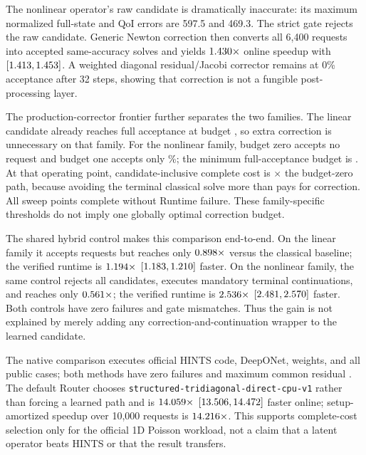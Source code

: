 The nonlinear operator's raw candidate is dramatically inaccurate: its maximum
normalized full-state and QoI errors are 597.5 and 469.3. The strict gate rejects
the raw candidate. Generic Newton correction then converts all 6,400 requests into
accepted same-accuracy solves and yields $1.430\times$ online
speedup with $[1.413,1.453]$. A weighted
diagonal residual/Jacobi corrector remains at 0\% acceptance after 32 steps, showing
that correction is not a fungible post-processing layer.

The production-corrector frontier further separates the two families. The linear
candidate already reaches full acceptance at budget
\LinearMinimumCorrectionBudget{}, so extra correction is unnecessary on that family.
For the nonlinear family, budget zero accepts no request and budget one accepts only
\NonlinearBudgetOneAcceptancePercent\%; the minimum full-acceptance budget is
\NonlinearMinimumCorrectionBudget{}. At that operating point, candidate-inclusive
complete cost is \NonlinearBudgetTwoVsZeroCostRatio{}$\times$ the budget-zero path,
because avoiding the terminal classical solve more than pays for correction. All
sweep points complete without Runtime failure. These family-specific thresholds do
not imply one globally optimal correction budget.

The shared hybrid control makes this comparison end-to-end. On the linear family it
accepts \LinearSharedAccepted{} requests but reaches only
$0.898\times$ versus the classical baseline; the verified
runtime is $1.194\times$
$[1.183,1.210]$ faster.
On the nonlinear family, the same control rejects all candidates, executes
\NonlinearSharedFallbacks{} mandatory terminal continuations, and reaches only
$0.561\times$; the verified runtime is
$2.536\times$
$[2.481,2.570]$
faster. Both controls have zero failures and gate mismatches. Thus the gain is not
explained by merely adding any correction-and-continuation wrapper to the learned
candidate.

The native comparison executes official HINTS code, DeepONet, weights, and all
\HintsNativeCases{} public cases; both methods have zero failures and maximum common
residual \HintsNativeMaximumResidual{}. The default Router chooses
\texttt{structured-tridiagonal-direct-cpu-v1} rather than forcing a learned path and
is $14.059\times$ $[13.506,14.472]$ faster online;
setup-amortized speedup over 10,000 requests is $14.216\times$.
This supports complete-cost selection only for the official 1D Poisson workload, not
a claim that a \system{} latent operator beats HINTS or that the result transfers.

